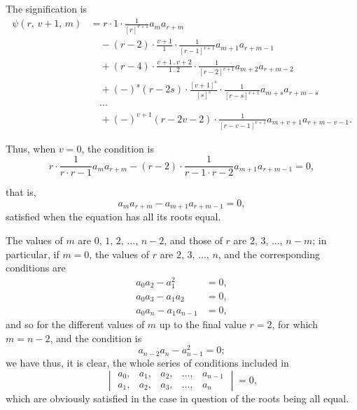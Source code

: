\documentclass[11pt]{article}
\begin{document}
The signification is
\begin{align*}
  \psi(r,\,v+1,\,m) &= r \cdot 1 \cdot \frac{1}{[r]^{v+1}} a_{m} a_{r+m}\\
  &\quad - (r - 2) \cdot \frac{v+1}{1} \cdot \frac{1}{[r-1]^{v+1}} a_{m+1} a_{r+m-1}\\
  &\quad + (r - 4) \cdot \frac{v+1\,.\,v+2}{1\,.\,2} \cdot \frac{1}{[r-2]^{v+1}} a_{m+2} a_{r+m-2}\\
  &\quad + (-)^{s} (r - 2s) \cdot \frac{[v+1]^{s}}{[s]^{s}} \cdot \frac{1}{[r-s]^{v+1}} a_{m+s} a_{r+m-s}\\
  &\quad \cdots\\
  &\quad + (-)^{v+1}(r - 2v - 2) \cdot \frac{1}{[r-v-1]^{v+1}} a_{m+v+1} a_{r+m-v-1}.
\end{align*}

Thus, when $v = 0$, the condition is
\[
  r \cdot \frac{1}{r \cdot r - 1} a_{m} a_{r+m} - (r - 2) \cdot \frac{1}{r - 1 \cdot r - 2} a_{m+1} a_{r+m-1} = 0,
\]

that is,
\[
  a_{m} a_{r+m} - a_{m+1} a_{r+m-1} = 0,
\]
satisfied when the equation has all its roots equal.

\medskip
The values of $m$ are $0,\,1,\,2,\,\ldots,\,n - 2$, and those of $r$ are
$2,\,3,\,\ldots,\,n - m$; in particular, if $m = 0$, the values of $r$ are
$2,\,3,\,\ldots,\,n$, and the corresponding conditions are
\begin{align*}
  a_{0} a_{2} - a_{1}^{2} &= 0,\\
  a_{0} a_{3} - a_{1} a_{2} &= 0,\\
  a_{0} a_{n} - a_{1} a_{n-1} &= 0,
\end{align*}
and so for the different values of $m$ up to the final value $r = 2$, for which $m = n - 2$,
and the condition is
\[
  a_{n-2} a_{n} - a_{n-1}^{2} = 0;
\]
we have thus, it is clear, the whole series of conditions included in
\[
  \begin{vmatrix}
    a_{0}, & a_{1}, & a_{2}, & \ldots, & a_{n-1}\\
    a_{1}, & a_{2}, & a_{3}, & \ldots, & a_{n}
  \end{vmatrix} = 0,
\]
which are obviously satisfied in the case in question of the roots being all equal.
\end{document}
